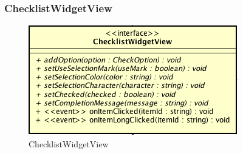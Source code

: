 \subsubsection{ChecklistWidgetView}

\label{ChecklistWidgetView}
\begin{figure}[ht]
	\centering
	\includegraphics[scale=0.5]{Sezioni/SottosezioniST/img/ChecklistWidgetView.png}
	\caption{ChecklistWidgetView}
\end{figure}

